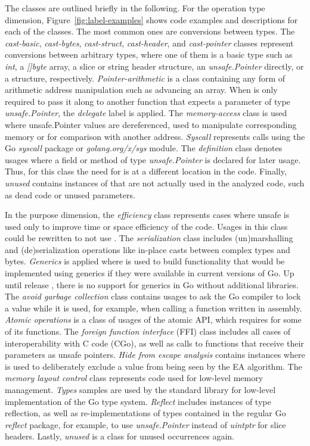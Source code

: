 The classes are outlined briefly in the following.
For the \unsafe{} operation type dimension, Figure~\ref{fig:label-examples} shows code examples and descriptions for
each of the classes.
The most common ones are conversions between types.
The \textit{cast-basic}, \textit{cast-bytes}, \textit{cast-struct}, \textit{cast-header}, and \textit{cast-pointer}
classes represent conversions between arbitrary types, where one of them is a basic type such as \textit{int}, a
\textit{[]byte} array, a slice or string header structure, an \textit{unsafe.Pointer} directly, or a structure,
respectively.
\textit{Pointer-arithmetic} is a class containing any form of arithmetic address manipulation such as advancing an
array.
When \unsafe{} is only required to pass it along to another function that expects a parameter of type
\textit{unsafe.Pointer}, the \textit{delegate} label is applied.
The \textit{memory-access} class is used where unsafe.Pointer values are dereferenced, used to manipulate corresponding
memory or for comparison with another address.
\textit{Syscall} represents calls using the Go \textit{syscall} package or \textit{golang.org/x/sys} module.
The \textit{definition} class denotes usages where a field or method of type \textit{unsafe.Pointer} is declared for
later usage.
Thus, for this class the need for \unsafe{} is at a different location in the code.
Finally, \textit{unused} contains instances of \unsafe{} that are not actually used in the analyzed code, such as dead
code or unused parameters.

In the purpose dimension, the \textit{efficiency} class represents cases where unsafe is used only to improve time or
space efficiency of the code.
Usages in this class could be rewritten to not use \unsafe{}.
The \textit{serialization} class includes (un)marshalling and (de)serialization operations like in-place casts between
complex types and bytes.
\textit{Generics} is applied where \unsafe{} is used to build functionality that would be implemented using generics if
they were available in current versions of Go.
Up until release , there is no support for generics in Go without additional libraries.
The \textit{avoid garbage collection} class contains usages to ask the Go compiler to lock a value while it is used, for
example, when calling a function written in assembly.
\textit{Atomic operations} is a class of usages of the atomic \acrshort{API}, which requires \unsafe{} for some of its
functions.
The \textit{foreign function interface} (\acrshort{FFI}) class includes all cases of interoperability with C code (CGo),
as well as calls to functions that receive their parameters as unsafe pointers.
\textit{Hide from escape analysis} contains instances where \unsafe{} is used to deliberately exclude a value from being
seen by the \acrshort{EA} algorithm.
The \textit{memory layout control} class represents code used for low-level memory management.
\textit{Types} samples are used by the standard library for low-level implementation of the Go type system.
\textit{Reflect} includes instances of type reflection, as well as re-implementations of types contained in the regular
Go \textit{reflect} package, for example, to use \textit{unsafe.Pointer} instead of \textit{uintptr} for slice headers.
Lastly, \textit{unused} is a class for unused occurrences again.



